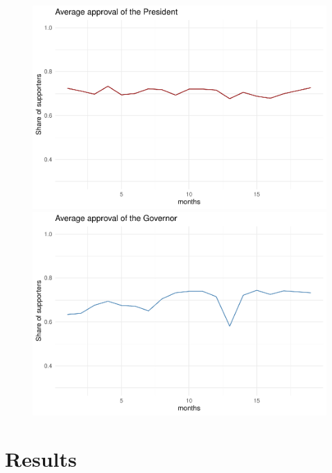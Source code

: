 \documentclass[
  english,
  man]{apa6}
\begin{document}
\begin{figure}[h]
\includegraphics[width=0.5\linewidth,]{Final_paper_files/figure-latex/figures-side-1} \includegraphics[width=0.5\linewidth,]{Final_paper_files/figure-latex/figures-side-2} \caption{ }\label{fig:figures-side}
\end{figure}

\hypertarget{results}{%
\section{Results}\label{results}}
\end{document}
